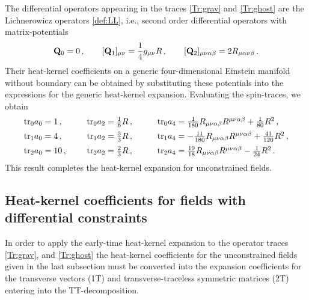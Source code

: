 \documentclass[preprint,preprintnumbers,amsmath,amssymb,nofootinbib,APS]{revtex4}
\newcommand{\be}{\begin{equation}}
\newcommand{\ee}{\end{equation}}
\let\m=\mu    \let\n=\nu    \let\x=\xi      \let\r=\rho \let\om=\omega
\newcommand{\tr}{{\rm tr}}
\newcommand{\2}{\sqrt{2\,}}
\newcommand{\bQ}{{\bf{Q}}}
\begin{document}
\begin{appendix}
The differential operators appearing in the traces \eqref{Tr:grav} and \eqref{Tr:ghost} are the Lichnerowicz operators
\eqref{def:LL}, i.e., second order differential operators with matrix-potentials
%
\be
\bQ_0 = 0 \, , \qquad 
[\bQ_1]_{\m\n} = \frac{1}{4} g_{\m\n} R \, , \qquad
[\bQ_2]_{\mu\nu\alpha\beta} = 2 R_{\mu\alpha\nu\beta} \,.
\ee
%
Their heat-kernel coefficients on a generic four-dimensional Einstein manifold without boundary 
can be obtained by substituting these potentials into the expressions for the generic heat-kernel expansion. Evaluating the spin-traces, we obtain
%
\be
\begin{array}{lll}
\tr_0 a_0 = 1 \, , \qquad &  
\tr_0 a_2 = \frac{1}{6} R \, , \qquad & 
\tr_0 a_4 = \frac{1}{180} R_{\m\n\alpha\beta} R^{\m\n\alpha\beta}  + \frac{1}{80}R^2 \, , 
\\[1.2ex]
%
\tr_1 a_0 = 4 \, , & 
\tr_1 a_2 = \frac{5}{3} R \, , & 
\tr_1 a_4 = -\frac{11}{180} R_{\m\n\alpha\beta} R^{\m\n\alpha\beta}  
+ \frac{41}{120}R^2 \, , 
\\[1.2ex]
%
\tr_{2} a_0 = 10 \, , &
\tr_{2} a_2 = \frac{2}{3} R \, , &
\tr_{2} a_4 = \frac{19}{18} R_{\m\n\alpha\beta} R^{\m\n\alpha\beta}  
- \frac{1}{24}R^2 \, . 
\end{array}
\ee
%
This result completes the heat-kernel expansion for unconstrained fields.
%  
\subsection{Heat-kernel coefficients for fields with differential constraints}
\label{App:B2}
In order to apply the early-time heat-kernel expansion to the operator traces \eqref{Tr:grav}, 
and \eqref{Tr:ghost} the heat-kernel coefficients for the unconstrained fields given in the last subsection 
must be converted into the expansion coefficients for the transverse vectors (1T) and transverse-traceless
symmetric matrices (2T) entering into the TT-decomposition. 


\end{appendix}
\end{document}
